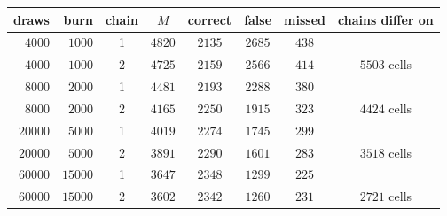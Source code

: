 \begin{center}
\footnotesize
\begin{tabular}{rrcccccc}
draws & burn & chain & $M$ & correct & false & missed & chains differ on \\
\hline
$4000$ & $1000$ & 1 & $4820$ & $2135$ & $2685$ & $438$ & \\
$4000$ & $1000$ & 2 & $4725$ & $2159$ & $2566$ & $414$ & $5503$ cells \\
$8000$ & $2000$ & 1 & $4481$ & $2193$ & $2288$ & $380$ & \\
$8000$ & $2000$ & 2 & $4165$ & $2250$ & $1915$ & $323$ & $4424$ cells \\
$20000$ & $5000$ & 1 & $4019$ & $2274$ & $1745$ & $299$ & \\
$20000$ & $5000$ & 2 & $3891$ & $2290$ & $1601$ & $283$ & $3518$ cells \\
$60000$ & $15000$ & 1 & $3647$ & $2348$ & $1299$ & $225$ & \\
$60000$ & $15000$ & 2 & $3602$ & $2342$ & $1260$ & $231$ & $2721$ cells \\
\end{tabular}
\end{center}
